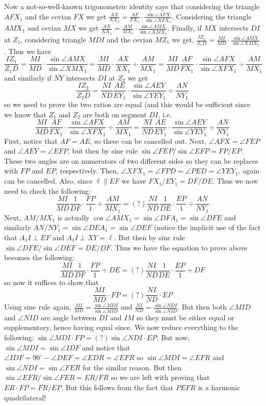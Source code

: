 \documentclass[11pt,a4paper]{article}
\begin{document}
\begin{enumerate}
	Now a not-so-well-known trigonometric identity says that considering the triangle $AFX_1$ and the cevian $FX$ we get $\frac{AX}{XX_1}=\frac{AF}{FX_1}\cdot \frac{\sin\angle AFX}{\sin\angle XFX_1}$. Considering the triangle $AMX_1$ and cevian $MX$ we get $\frac{AX}{XX_1}=\frac{AM}{MX_1}\cdot \frac{\sin\angle AMX}{\sin\angle XMX_1}$. Finally, if $MX$ intersects $DI$ at $Z_1$, considering triangle $MDI$ and the cevian $MZ_1$ we get, $\frac{IZ_1}{Z_1D}=\frac{MI}{MD}\cdot \frac{\sin\angle AMX}{\sin\angle XMX_1}$. Thus we have
	\[
	\frac{IZ_1}{Z_1D}=\frac{MI}{MD}\cdot \frac{\sin\angle AMX}{\sin\angle XMX_1}
	=\frac{MI}{MD}\cdot \frac{AX}{XX_1}\div \frac{AM}{MX_1}
	=\frac{MI}{MD}\frac{AF}{FX_1}\cdot \frac{\sin\angle AFX}{\sin\angle XFX_1}\div \frac{AM}{MX_1}
	\]and similarly if $NY$ intersects $DI$ at $Z_2$ we get
	\[
	\frac{IZ_2}{Z_2D}
	=\frac{NI}{ND}\frac{AE}{EY_1}\cdot \frac{\sin\angle AEY}{\sin\angle YEY_1}\div \frac{AN}{NY_1}
	\]so we need to prove the two ratios are equal (and this would be sufficient since we know that $Z_1$ and $Z_2$ are both on segment $DI$, i.e.
	\[
	\frac{MI}{MD}\frac{AF}{FX_1}\cdot \frac{\sin\angle AFX}{\sin\angle XFX_1}\div \frac{AM}{MX_1}
	=\frac{NI}{ND}\frac{AE}{EY_1}\cdot \frac{\sin\angle AEY}{\sin\angle YEY_1}\div \frac{AN}{NY_1}
	\]First, notice that $AF=AE$, so these can be cancelled out. Next, $\angle AFX=\angle FEP$ and $\angle AEY=\angle EFP$, but then by sine rule $\sin\angle FEP/\sin\angle EFP=FP/EP$. These two angles are on numerators of two different sides so they can be replaces with $FP$ and $EP$, respectively. Then, $\angle XFX_1=\angle FPD=\angle PED = \angle YEY_1$, again can be cancelled.
	Also, since $\ell\parallel EF$ we have $FX_1/EY_1=DF/DE$.
	Thus we now need to check the following:
	\[
	\frac{MI}{MD}\frac{1}{DF}\cdot \frac{FP}{1}\div \frac{AM}{MX_1}
	=(?)\frac{NI}{ND}\frac{1}{DE}\cdot \frac{EP}{1}\div \frac{AN}{NY_1}
	\]Next, $AM/MX_1$ is actually $\cos \angle AMX_1=\sin \angle DFA_1=\sin\angle DFE$ and similarly $AN/NY_1=\sin \angle DEA_1=\sin\angle DEF$ (notice the implicit use of the fact that $A_1I\perp EF$ and $A_1I\perp XY=\ell$. But then by sine rule $\sin\angle DFE/\sin\angle DEF=DE/DF$. Thus we have the equation to prove above becomes the following:
	\[
	\frac{MI}{MD}\frac{1}{DF}\cdot \frac{FP}{1}\div DE
	=(?)\frac{NI}{ND}\frac{1}{DE}\cdot \frac{EP}{1}\div DF
	\]so now it suffices to show that
	\[
	\frac{MI}{MD}\cdot FP
	=(?)\frac{NI}{ND}\cdot EP
	\]Using sine rule again, $\frac{MI}{MD}=\frac{\sin\angle MDI}{\sin\angle MID}$ and $\frac{NI}{ND}=\frac{\sin\angle NDI}{\sin\angle NID}$. But then both $\angle MID$ and $\angle NID$ are angle between $DI$ and $IM$ so they must be either equal or supplementary, hence having equal since. We now reduce everything to the following: $\sin\angle MDI\cdot FP=(?)\sin\angle NDI\cdot EP$.
	But now, $\sin\angle MDI=\sin\angle IDF$ and notice that $\angle IDF=90^{\circ}-\angle DEF=\angle EDR=\angle EFR$ so $\sin\angle MDI=\angle EFR$ and $\sin\angle NDI=\sin\angle FER$ for the similar reason. But then $\sin\angle EFR/\sin\angle FER = ER/FR$ so we are left with proving that $ER\cdot FP=FR/ EP$. But this follows from the fact that $PEFR$ is a harmonic quadrilateral!
\end{enumerate}
\end{document}
